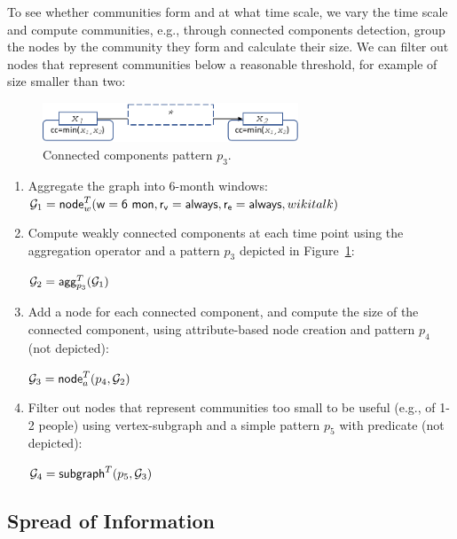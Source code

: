 To see whether communities form and at what time scale, we vary the
time scale and compute communities, e.g., through connected components
detection, group the nodes by the community they form and calculate
their size.  We can filter out nodes that represent communities
below a reasonable threshold, for example of size smaller than two:

\begin{figure}
\centering
\includegraphics[width=3in]{figs/ccp.pdf}
\caption{Connected components pattern $p_3$.}
\vspace{-0.2cm}
\label{fig:ccp}
\vspace{-0.2cm}
\end{figure}

\begin{enumerate}[itemindent=\dimexpr\labelwidth+\labelsep\relax,leftmargin=0pt]
\item Aggregate the graph into 6-month windows:\\

$\mathcal{G}_1 = \textsf{node}^T_w(\mathsf{w=6~mon},\mathsf{r_v=always},\mathsf{r_e=always},wikitalk)$

\item Compute weakly connected components at each time point using the aggregation operator and a pattern $p_3$ depicted in Figure~\ref{fig:ccp}:

$\mathcal{G}_2 = \textsf{agg}^T_{p_3}(\mathcal{G}_1)$

\item Add a node for each connected component, and compute the size of
  the connected component, using attribute-based node creation and
  pattern $p_4$ (not depicted): 

$\mathcal{G}_3 =
  \textsf{node}^T_a(p_4,\mathcal{G}_2)$

\item Filter out nodes that represent communities too small to be
  useful (e.g., of 1-2 people) using vertex-subgraph and a simple
  pattern $p_5$ with  predicate (not depicted): 

$\mathcal{G}_4 = \textsf{subgraph}^T(p_5,\mathcal{G}_3)$
\end{enumerate}

\subsection{ Spread of Information} 

